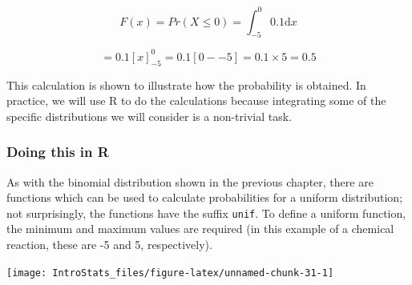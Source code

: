 \documentclass[
  oneside]{krantz}
\newenvironment{Shaded}{\begin{snugshade}}{\end{snugshade}}
\newcommand{\AttributeTok}[1]{\textcolor[rgb]{0.77,0.63,0.00}{#1}}
\newcommand{\CommentTok}[1]{\textcolor[rgb]{0.56,0.35,0.01}{\textit{#1}}}
\newcommand{\DecValTok}[1]{\textcolor[rgb]{0.00,0.00,0.81}{#1}}
\newcommand{\FloatTok}[1]{\textcolor[rgb]{0.00,0.00,0.81}{#1}}
\newcommand{\FunctionTok}[1]{\textcolor[rgb]{0.00,0.00,0.00}{#1}}
\newcommand{\NormalTok}[1]{#1}
\newcommand{\OtherTok}[1]{\textcolor[rgb]{0.56,0.35,0.01}{#1}}
\newcommand{\SpecialCharTok}[1]{\textcolor[rgb]{0.00,0.00,0.00}{#1}}
\newcommand{\StringTok}[1]{\textcolor[rgb]{0.31,0.60,0.02}{#1}}
\begin{document}
\[ F(x) = Pr(X \leq 0) = \int_{-5}^{0} 0.1 \mathrm{d}x \]

\[ = 0.1[x]_{-5}^{0} = 0.1[0 - -5] = 0.1 \times 5 = 0.5 \]

This calculation is shown to illustrate how the probability is obtained. In practice, we will use R to do the calculations because integrating some of the specific distributions we will consider is a non-trivial task.

\hypertarget{doing-this-in-r-6}{%
\subsubsection{Doing this in R}\label{doing-this-in-r-6}}

As with the binomial distribution shown in the previous chapter, there are functions which can be used to calculate probabilities for a uniform distribution; not surprisingly, the functions have the suffix \texttt{unif}. To define a uniform function, the minimum and maximum values are required (in this example of a chemical reaction, these are -5 and 5, respectively).

\begin{Shaded}
\end{Shaded}

\begin{center}\texttt{[image: IntroStats\_files/figure-latex/unnamed-chunk-31-1]} \end{center}
\end{document}
